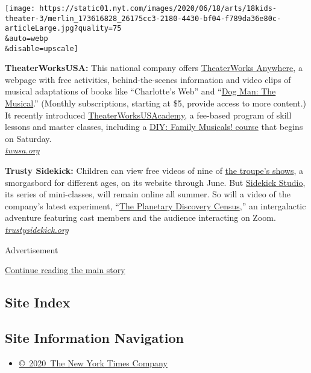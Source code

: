 \texttt{[image: https://static01.nyt.com/images/2020/06/18/arts/18kids-theater-3/merlin\_173616828\_26175cc3-2180-4430-bf04-f789da36e80c-articleLarge.jpg?quality=75\\\&auto=webp\\\&disable=upscale]}

\textbf{TheaterWorksUSA:} This national company offers
\href{https://twusa.org/shows-artists/on-tour/anywhere/}{TheaterWorks
Anywhere}, a webpage with free activities, behind-the-scenes information
and video clips of musical adaptations of books like ``Charlotte's Web''
and
``\href{https://www.nytimes.com/2019/07/09/theater/review-dog-man-the-musical.html}{Dog
Man: The Musical}.'' (Monthly subscriptions, starting at \$5, provide
access to more content.) It recently introduced
\href{https://twusa.org/academy/}{TheaterWorksUSAcademy}, a fee-based
program of skill lessons and master classes, including a
\href{https://twusa.org/academy/diy-family-musicals/}{DIY: Family
Musicals! course} that begins on Saturday.\\
\href{https://twusa.org/}{\emph{twusa.org}}

\textbf{Trusty Sidekick:} Children can view free videos of nine of
\href{https://www.trustysidekick.org/the-shows}{the troupe's shows}, a
smorgasbord for different ages, on its website through June. But
\href{https://www.trustysidekick.org/studio}{Sidekick Studio}, its
series of mini-classes, will remain online all summer. So will a video
of the company's latest experiment,
``\href{https://www.trustysidekick.org/planetarycensus-view}{The
Planetary Discovery Census},'' an intergalactic adventure featuring cast
members and the audience interacting on Zoom.\\
\href{https://www.trustysidekick.org/}{\emph{trustysidekick.org}}

Advertisement

\protect\hyperlink{after-bottom}{Continue reading the main story}

\hypertarget{site-index}{%
\subsection{Site Index}\label{site-index}}

\hypertarget{site-information-navigation}{%
\subsection{Site Information
Navigation}\label{site-information-navigation}}

\begin{itemize}
\tightlist
\item
  \href{https://help.nytimes.com/hc/en-us/articles/115014792127-Copyright-notice}{©~2020~The
  New York Times Company}
\end{itemize}


